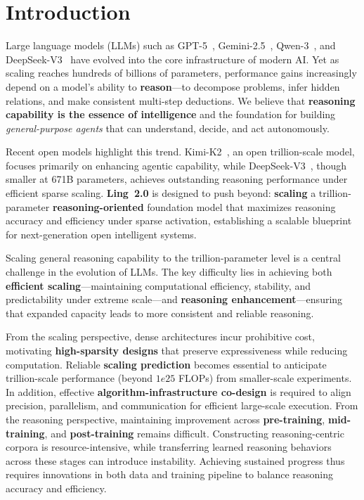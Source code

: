 
\section{Introduction}

Large language models (LLMs) such as GPT-5~\citep{openai2025gpt5}, Gemini-2.5~\citep{comanici2025gemini}, Qwen-3~\citep{qwen3}, and DeepSeek-V3~\citep{deepseekai2024deepseekv3technicalreport} have evolved into the core infrastructure of modern AI. 
Yet as scaling reaches hundreds of billions of parameters, performance gains increasingly depend on a model’s ability to \textbf{reason}—to decompose problems, infer hidden relations, and make consistent multi-step deductions. 
We believe that \textbf{reasoning capability is the essence of intelligence} and the foundation for building \textit{general-purpose agents} that can understand, decide, and act autonomously.

Recent open models highlight this trend. Kimi-K2~\citep{kimiK2}, an open trillion-scale model, focuses primarily on enhancing agentic capability, while DeepSeek-V3~\citep{deepseekai2024deepseekv3technicalreport}, though smaller at 671B parameters, achieves outstanding reasoning performance under efficient sparse scaling. 
{\textbf{Ling~2.0}} is designed to push beyond: \textbf{scaling} a trillion-parameter \textbf{reasoning-oriented} foundation model that maximizes reasoning accuracy and efficiency under sparse activation, establishing a scalable blueprint for next-generation open intelligent systems.

Scaling general reasoning capability to the trillion-parameter level is a central challenge in the evolution of LLMs. 
The key difficulty lies in achieving both \textbf{efficient scaling}—maintaining computational efficiency, stability, and predictability under extreme scale—and \textbf{reasoning enhancement}—ensuring that expanded capacity leads to more consistent and reliable reasoning.

From the scaling perspective, dense architectures incur prohibitive cost, motivating \textbf{high-sparsity designs} that preserve expressiveness while reducing computation. 
Reliable \textbf{scaling prediction} becomes essential to anticipate trillion-scale performance (beyond $1e25$ FLOPs) from smaller-scale experiments. 
In addition, effective \textbf{algorithm-infrastructure co-design} is required to align precision, parallelism, and communication for efficient large-scale execution. 
From the reasoning perspective, maintaining improvement across \textbf{pre-training}, \textbf{mid-training}, and \textbf{post-training} remains difficult. 
Constructing reasoning-centric corpora is resource-intensive, while transferring learned reasoning behaviors across these stages can introduce instability. 
Achieving sustained progress thus requires innovations in both data and training pipeline to balance reasoning accuracy and efficiency. 


